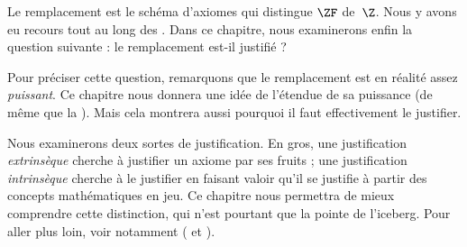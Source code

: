 \documentclass[../../../include/open-logic-section]{subfiles}
\begin{document}

Le remplacement est le schéma d'axiomes qui distingue $\ZF$ de~$\Z$.
Nous y avons eu recours tout au long des
. Dans ce chapitre,
nous examinerons enfin la question suivante : le remplacement est-il justifié ?

Pour préciser cette question, remarquons que le remplacement est en réalité
assez \emph{puissant}. Ce chapitre nous donnera une idée de l'étendue de sa
puissance (de même que la ). Mais cela
montrera aussi pourquoi il faut effectivement le justifier.

Nous examinerons deux sortes de justification. En gros, une justification
\emph{extrinsèque} cherche à justifier un axiome par ses fruits ; une
justification \emph{intrinsèque} cherche à le justifier en faisant valoir
qu'il se justifie à partir des concepts mathématiques en jeu. Ce chapitre nous permettra
de mieux comprendre cette distinction, qui n'est pourtant que la pointe
de l'iceberg. Pour aller plus loin, voir notamment \citeauthor{Maddy1988a}
(\citeyear{Maddy1988a} et \citeyear{Maddy1988b}).
\end{document}
